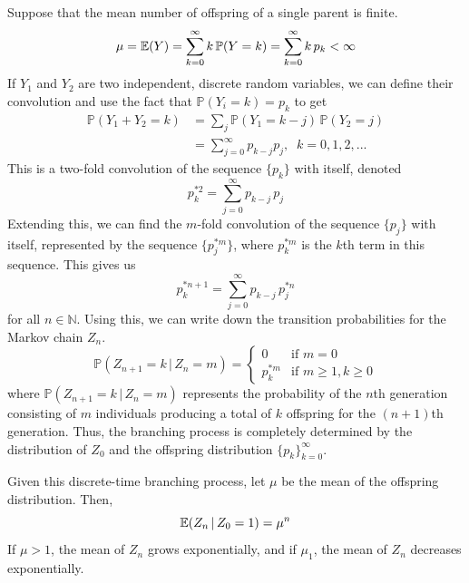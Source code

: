 	Suppose that the mean number of offspring of a single parent is finite. 
	\begin{equation}
		\mu = \operatorname{\mathbb{E}}(Y) = \sum_{k=0}^\infty k \, \mathbb{P}(Y = k) = \sum_{k=0}^\infty k \, p_k < \infty
	\end{equation}
	If $Y_1$ and $Y_2$ are two independent, discrete random variables, we can define their convolution and use the fact that $\mathbb{P}(Y_i = k) = p_k$ to get
	\begin{align*}
		\mathbb{P}(Y_1 + Y_2 = k) & = \sum_j \mathbb{P}(Y_1 = k - j) \, \mathbb{P}(Y_2 = j) \\
		& = \sum_{j=0}^\infty p_{k-j} p_j, \;\; k = 0, 1, 2, ...
	\end{align*}
	This is a two-fold convolution of the sequence $\{p_k\}$ with itself, denoted
	\begin{equation}
		p_k^{*2} = \sum_{j=0}^\infty p_{k-j} \, p_j
	\end{equation}
	Extending this, we can find the $m$-fold convolution of the sequence $\{p_j\}$ with itself, represented by the sequence $\{p_j^{*m}\}$, where $p_k^{*m}$ is the $k$th term in this sequence. This gives us
	\begin{equation}
		p_k^{*n+1} = \sum_{j=0}^\infty p_{k-j} \, p_j^{*n}
	\end{equation}
	for all $n \in \mathbb{N}$. Using this, we can write down the transition probabilities for the Markov chain $Z_n$. 
	\begin{equation}
		\mathbb{P}(Z_{n+1} = k \, | \, Z_n = m) = \begin{cases}
		0 & \text{if } m = 0 \\
		p_k^{*m} & \text{if } m \geq 1, k \geq 0
		\end{cases}
	\end{equation}
	where $\mathbb{P}(Z_{n+1} = k \, | \, Z_n = m)$ represents the probability of the $n$th generation consisting of $m$ individuals producing a total of $k$ offspring for the $(n+1)$th generation. Thus, the branching process is completely determined by the distribution of $Z_0$ and the offspring distribution $\{p_k\}_{k=0}^\infty$. 

	\begin{lemma}
		\label{thm:mean-population-size-of-a-branching-process}
		Given this discrete-time branching process, let $\mu$ be the mean of the offspring distribution. Then, 
		\begin{equation}
			\operatorname{\mathbb{E}}(Z_n \, | \, Z_0 = 1) = \mu^n
		\end{equation}
		If $\mu > 1$, the mean of $Z_n$ grows exponentially, and if $\mu_1$, the mean of $Z_n$ decreases exponentially. 
	\end{lemma}


